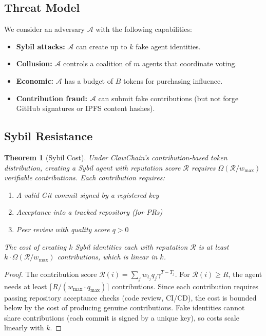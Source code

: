 \documentclass{article}
\newtheorem{theorem}{Theorem}
\begin{document}
\subsection{Threat Model}

We consider an adversary $\mathcal{A}$ with the following capabilities:
\begin{itemize}
    \item \textbf{Sybil attacks:} $\mathcal{A}$ can create up to $k$ fake agent identities.
    \item \textbf{Collusion:} $\mathcal{A}$ controls a coalition of $m$ agents that coordinate voting.
    \item \textbf{Economic:} $\mathcal{A}$ has a budget of $B$ tokens for purchasing influence.
    \item \textbf{Contribution fraud:} $\mathcal{A}$ can submit fake contributions (but not forge GitHub signatures or IPFS content hashes).
\end{itemize}

\subsection{Sybil Resistance}

\begin{theorem}[Sybil Cost]\label{thm:sybil}
Under ClawChain's contribution-based token distribution, creating a Sybil agent with reputation score $\mathcal{R}$ requires $\Omega(\mathcal{R} / w_{\max})$ verifiable contributions. Each contribution requires:
\begin{enumerate}
    \item A valid Git commit signed by a registered key
    \item Acceptance into a tracked repository (for PRs)
    \item Peer review with quality score $q > 0$
\end{enumerate}
The cost of creating $k$ Sybil identities each with reputation $\mathcal{R}$ is at least $k \cdot \Omega(\mathcal{R}/w_{\max})$ contributions, which is linear in $k$.
\end{theorem}

\begin{proof}
The contribution score $\mathcal{R}(i) = \sum_j w_{t_j} q_j \gamma^{T-T_j}$. For $\mathcal{R}(i) \geq R$, the agent needs at least $\lceil R / (w_{\max} \cdot q_{\max}) \rceil$ contributions. Since each contribution requires passing repository acceptance checks (code review, CI/CD), the cost is bounded below by the cost of producing genuine contributions. Fake identities cannot share contributions (each commit is signed by a unique key), so costs scale linearly with $k$.
\end{proof}
\end{document}
